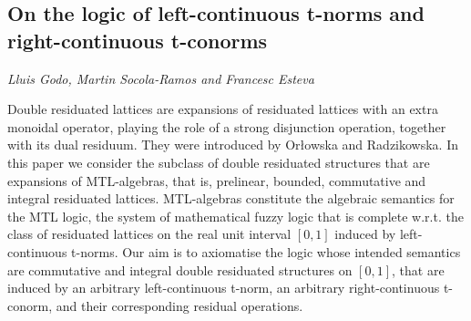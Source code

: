 \documentclass[../booklet.tex]{subfiles}
\begin{document}
\subsection[On the logic of left-continuous t-norms and right-continuous t-conorms. {\it Lluis Godo, Martin Socola-Ramos and Francesc Esteva}]{On the logic of left-continuous t-norms and right-continuous t-conorms}
  

\begin{center}
  {\it Lluis Godo, Martin Socola-Ramos and Francesc Esteva}
\end{center}

\vskip 0.8cm


Double residuated lattices are expansions of residuated lattices with an extra monoidal operator, playing the role of a strong disjunction operation, together with its dual residuum. They were introduced by Or{\l}owska and Radzikowska. In this paper we consider the subclass of double residuated structures that are expansions  of MTL-algebras, that is, prelinear, bounded, commutative and integral residuated lattices. MTL-algebras constitute the algebraic semantics for the MTL logic, the system of mathematical fuzzy logic that is complete w.r.t. the class of residuated lattices on the real unit interval $[0,1]$ induced by left-continuous t-norms. Our aim is to axiomatise the logic whose intended semantics are commutative and integral double residuated structures on $[0, 1]$, that are induced by an arbitrary left-continuous t-norm, an arbitrary right-continuous t-conorm, and their corresponding residual operations.
\end{document}
